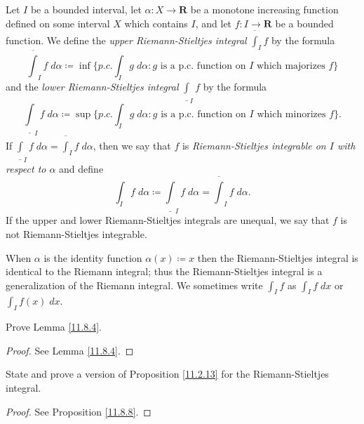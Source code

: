 \begin{definition}\label{11.8.11}
    Let \(I\) be a bounded interval, let \(\alpha : X \to \mathbf{R}\) be a monotone increasing function defined on some interval \(X\) which contains \(I\), and let \(f : I \to \mathbf{R}\) be a bounded function.
    We define the \emph{upper Riemann-Stieltjes integral} \(\overline{\int}_I f\) by the formula
    \[
        \overline{\int}_I f \; d \alpha \coloneqq \inf\{p.c. \int_I g \; d \alpha : g \text{ is a p.c. function on \(I\) which majorizes } f\}
    \]
    and the \emph{lower Riemann-Stieltjes integral} \(\underline{\int}_I f\) by the formula
    \[
        \underline{\int}_I f \; d \alpha \coloneqq \sup\{p.c. \int_I g \; d \alpha : g \text{ is a p.c. function on \(I\) which minorizes } f\}.
    \]
    If \(\underline{\int}_I f \; d \alpha = \overline{\int}_I f \; d \alpha\), then we say that \(f\) is \emph{Riemann-Stieltjes integrable on \(I\) with respect to \(\alpha\)} and define
    \[
        \int_I f \; d \alpha \coloneqq \underline{\int}_I f \; d \alpha = \overline{\int}_I f \; d \alpha.
    \]
    If the upper and lower Riemann-Stieltjes integrals are unequal, we say that \(f\) is not Riemann-Stieltjes integrable.
\end{definition}

\begin{note}
    When \(\alpha\) is the identity function \(\alpha(x) \coloneqq x\) then the Riemann-Stieltjes integral is identical to the Riemann integral;
    thus the Riemann-Stieltjes integral is a generalization of the Riemann integral.
    We sometimes write \(\int_I f\) as \(\int_I f \; dx\) or \(\int_I f(x) \; dx\).
\end{note}

\exercisesection

\begin{exercise}\label{ex 11.8.1}
    Prove Lemma \ref{11.8.4}.
\end{exercise}

\begin{proof}
    See Lemma \ref{11.8.4}.
\end{proof}

\begin{exercise}\label{ex 11.8.2}
    State and prove a version of Proposition \ref{11.2.13} for the Riemann-Stieltjes integral.
\end{exercise}

\begin{proof}
    See Proposition \ref{11.8.8}.
\end{proof}

